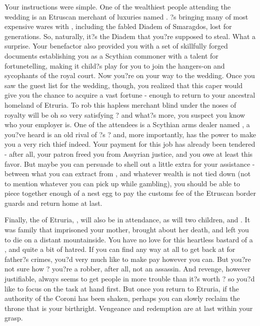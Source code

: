 \documentclass[char]{Kos}
\begin{document}
    Your instructions were simple. One of the wealthiest people attending the wedding is an Etruscan merchant of luxuries named \cMerchant{}. \cMerchant{\They}?s bringing many of \cMerchant{\their} most expensive wares with \cMerchant{\them}, including the fabled Diadem of Smaragdos, lost for generations. So, naturally, it?s the Diadem that you?re supposed to steal. What a surprise. Your benefactor also provided you with a set of skillfully forged documents establishing you as a Scythian commoner with a talent for fortunetelling, making it child?s play for you to join the hangers-on and sycophants of the royal court. Now you?re on your way to the wedding. Once you saw the guest list for the wedding, though, you realized that this caper would give you the chance to acquire a vast fortune - enough to return to your ancestral homeland of Etruria. To rob this hapless merchant blind under the noses of royalty will be oh so very satisfying ? and what?s more, you suspect you know who your employer is. One of the attendees is a Scythian arms dealer named \cArmsDealer{}, a \cArmsDealer{\human} you?ve heard is an old rival of \cMerchant{}?s ? and, more importantly, \cArmsDealer{\they} has the power to make you a very rich thief indeed. Your payment for this job has already been tendered - after all, your patron freed you from Assyrian justice, and you owe \cArmsDealer{\them} at least this favor. But maybe you can persuade \cArmsDealer{\them} to shell out a little extra for your assistance - between what you can extract from \cArmsDealer{\them}, and whatever wealth is not tied down (not to mention whatever you can pick up while gambling), you should be able to piece together enough of a nest egg to pay the customs fee of the Etruscan border guards and return home at last. 

    Finally, the \cEtruriaKing{\monarch} of Etruria, \cEtruriaKing{}, will also be in attendance, as will \cEtruriaKing{\their} two children, \cGroom{} and \cPoet{}. It was \cEtruriaKing{\their} family that imprisoned your mother, brought about her death, and left you to die on a distant mountainside. You have no love for this heartless bastard of a \cEtruriaKing{\human}, and quite a bit of hatred. If you can find any way at all to get back at \cEtruriaKing{} for \cEtruriaKing{\their} father?s crimes, you?d very much like to make \cEtruriaKing{\them} pay however you can. But you?re not sure how ? you?re a robber, after all, not an assassin. And revenge, however justifiable, always seems to get people in more trouble than it?s worth ? so you?d like to focus on the task at hand first. But once you return to Etruria, if the authority of the Coroni has been shaken, perhaps you can slowly reclaim the throne that is your birthright. Vengeance and redemption are at last within your grasp. 
\end{document}
